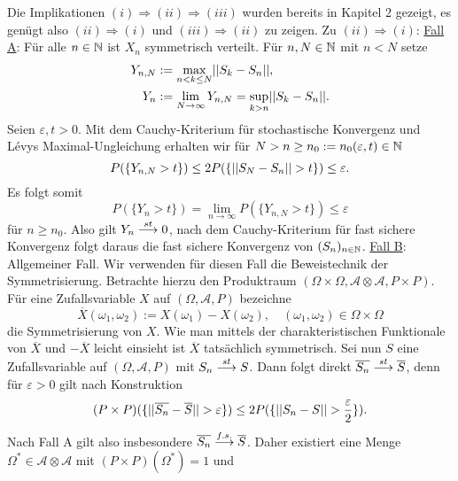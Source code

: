 \begin{proof*}%
    Die Implikationen $(i) \Rightarrow (ii) \Rightarrow (iii)$ wurden bereits in Kapitel 2 gezeigt, es genügt also $(ii) \Rightarrow (i)$ und $(iii) \Rightarrow (ii)$ zu zeigen. 
    \newline 
    Zu $(ii) \Rightarrow (i)$: \underline{Fall A}: Für alle $n \in \mathbb{N}$ ist $X_n$ symmetrisch verteilt. 
    \newline 
    Für $n, N \in \mathbb{N}$ mit $n < N$ setze 
    \begin{align*}
        Y_{n,N} &:= \max_{n < k \leq N}\lvert\lvert S_k - S_n \rvert\rvert, \\\
        Y_n     &:= \lim_{N \to \infty} Y_{n,N} = \sup_{k > n} \lvert\lvert S_k - S_n \rvert\rvert. 
    \end{align*}
    Seien $\varepsilon, t > 0$. Mit dem Cauchy-Kriterium für stochastische Konvergenz und Lévys Maximal-Ungleichung erhalten wir für $N > n \geq n_0 := n_0(\varepsilon,t) \in \mathbb{N}$
    $$
        P(\{ Y_{n, N} > t\}) \leq 2P(\{ \lvert\lvert S_N - S_n \rvert\rvert > t\}) \leq \varepsilon . 
    $$
    Es folgt somit 
    $$
        P(\{Y_n > t \}) = \lim_{n \to \infty}P(\{Y_{n,N} > t \}) \leq \varepsilon
    $$
    für $n \geq n_0$. Also gilt $Y_n \overset{st}{\longrightarrow} 0$, nach dem Cauchy-Kriterium für fast sichere Konvergenz folgt daraus die fast sichere Konvergenz von $(S_n)_{n \in \mathbb{N}}$. 
    \newline \underline{Fall B}: Allgemeiner Fall.
    \newline 
    Wir verwenden für diesen Fall die Beweistechnik der Symmetrisierung.  
    Betrachte hierzu den Produktraum $(\Omega \times \Omega, \mathcal{A}\otimes\mathcal{A}, P \times P)$. Für eine Zufallsvariable $X$ auf $(\Omega, \mathcal{A}, P)$ bezeichne
    $$
        \overline{X}(\omega_1, \omega_2) := X(\omega_1) - X(\omega_2), \quad (\omega_1, \omega_2) \in \Omega \times \Omega
    $$   
    die Symmetrisierung von $X$. Wie man mittels der charakteristischen Funktionale von $\overline{X}$ und $-\overline{X}$ leicht einsieht ist $\overline{X}$ tatsächlich symmetrisch. 
    Sei nun $S$ eine Zufallsvariable auf $(\Omega, \mathcal{A}, P)$ mit $S_n \overset{st}{\longrightarrow} S$. 
    Dann folgt direkt $\overline{S_n} \overset{st}{\longrightarrow} \overline{S}$, denn für $\varepsilon > 0$ gilt nach Konstruktion
    $$
        (P\times P)(\{ \lvert\lvert \overline{S_n} - \overline{S} \rvert\rvert > \varepsilon \} ) \leq 2P(\{ \lvert\lvert S_n - S \rvert\rvert > \frac{\varepsilon}{2} \}).
    $$
    Nach Fall A gilt also insbesondere $\overline{S_n} \overset{f.s.}{\longrightarrow}  \overline{S}$. Daher existiert eine Menge $\Omega^* \in \mathcal{A}\otimes\mathcal{A}$ mit \mbox{$(P\times P)(\Omega^*) = 1$} und

\end{proof*}
